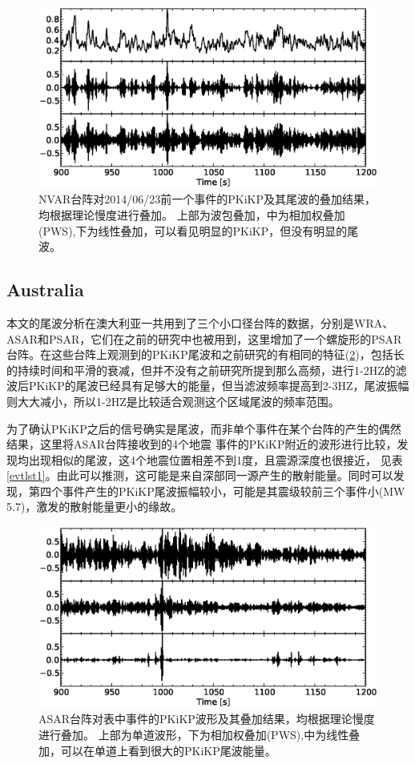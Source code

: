 \begin{figure}
	\centering
	\includegraphics[width=12cm,height=6cm]{fig/chap3/nvar_mul2.eps}
	\caption{NVAR台阵对2014/06/23前一个事件的PKiKP及其尾波的叠加结果，均根据理论慢度进行叠加。%
上部为波包叠加，中为相加权叠加(PWS),下为线性叠加，可以看见明显的PKiKP，但没有明显的尾波。}
	\label{nvar_mul2}
\end{figure}

\subsection{Australia}

本文的尾波分析在澳大利亚一共用到了三个小口径台阵的数据，分别是WRA、ASAR和PSAR，它们在之前的研究中也被用到，这里增加了一个螺旋形的PSAR台阵。在这些台阵上观测到的PKiKP尾波和之前研究的有相同的特征(\ref{asar_mul})，包括长的持续时间和平滑的衰减，但并不没有之前研究所提到那么高频，进行1-2HZ的滤波后PKiKP的尾波已经具有足够大的能量，但当滤波频率提高到2-3HZ，尾波振幅则大大减小，所以1-2HZ是比较适合观测这个区域尾波的频率范围。

为了确认PKiKP之后的信号确实是尾波，而非单个事件在某个台阵的产生的偶然结果，这里将ASAR台阵接收到的4个地震
事件的PKiKP附近的波形进行比较，发现均出现相似的尾波，这4个地震位置相差不到1度，且震源深度也很接近，
见表\ref{evtlst1}。由此可以推测，这可能是来自深部同一源产生的散射能量。同时可以发现，第四个事件产生的PKiKP尾波振幅较小，可能是其震级较前三个事件小(MW 5.7)，激发的散射能量更小的缘故。

\begin{figure}
	\centering
	\includegraphics[width=12cm,height=6cm]{fig/chap3/asar_mul.eps}
	\caption{ASAR台阵对表中事件的PKiKP波形及其叠加结果，均根据理论慢度进行叠加。%
上部为单道波形，下为相加权叠加(PWS),中为线性叠加，可以在单道上看到很大的PKiKP尾波能量。}
	\label{asar_mul}
\end{figure}


